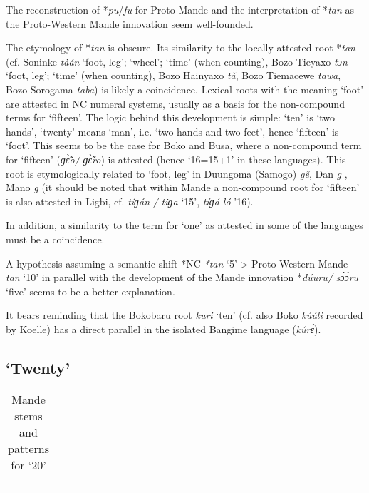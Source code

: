 {The reconstruction of *\textit{pu}/\textit{fu} for Proto-Mande and the interpretation of *\textit{tan} as the Proto-Western Mande innovation seem well-founded. 

The etymology of *\textit{tan} is obscure. Its similarity to the locally attested root *\textit{tan} (cf. Soninke \textit{tàán} ‘foot, leg’; ‘wheel’; `time’ (when counting), Bozo Tieyaxo \textit{tɔn} ‘foot, leg’; ‘time’ (when counting), Bozo Hainyaxo \textit{t{\v{a}}}, Bozo Tiemacewe \textit{tawa}, Bozo Sorogama \textit{taba}) is likely a coincidence. Lexical roots with the meaning ‘foot’ are attested in NC numeral systems, usually as a basis for the non-compound terms for ‘fifteen’. The logic behind this development is simple: ‘ten’ is ‘two hands’, ‘twenty’ means ‘man’, i.e. ‘two hands and two feet’, hence ‘fifteen’ is ‘foot’. This seems to be the case for Boko and Busa, where a non-compound term for ‘fifteen’ (\textit{ɡ{\`{\~ɛ}}o/} \textit{ɡ{\`{\~ɛ}}ro}) is attested (hence ‘16=15+1’ in these languages). This root is etymologically related to ‘foot, leg’ in Duungoma (Samogo) \textit{g{\~{e}}}, Dan \textit{g{}} , Mano \textit{g{}} (it should be noted that within Mande a non-compound root for ‘fifteen’ is also attested in Ligbi, cf. \textit{tíɡán} \textit{/} \textit{tiɡa} ‘15’, \textit{tíɡá-ló} ’16).

In addition, a similarity to the term for ‘one’ as attested in some of the languages must be a coincidence.

A hypothesis assuming a semantic shift *NC \textit{*tan} ‘5’ > Proto-Western-Mande \textit{tan} ‘10’ in parallel with the development of the Mande innovation *\textit{d{\'{u}}uru/} \textit{s{\'{ɔ}}{\'{ɔ}}ru} ‘five’ seems to be a better explanation. 

It bears reminding that the Bokobaru root \textit{kuri} ‘ten’ (cf. also Boko \textit{k{\'{u}}{\'{u}}li} recorded by Koelle) has a direct parallel in the isolated Bangime language (\textit{k{\'{u}}r{\'{ɛ}}}).


\subsection{‘Twenty’}%
\begin{table}
\caption{\label{tab:3:212}Mande stems and patterns for `20'}


\begin{tabularx}{\textwidth}{lXXX}
\lsptoprule


\end{tabularx}
\end{table}}
